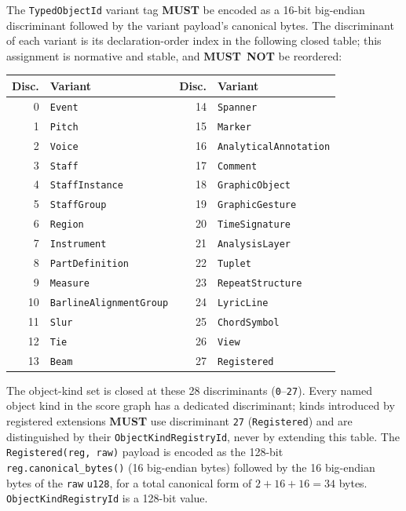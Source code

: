 \documentclass[11pt,letterpaper]{report}
\newcounter{requirement}[chapter]
\newcommand{\MUST}{\textbf{MUST}}
\newcommand{\MUSTNOT}{\textbf{MUST}\nobreak\ \textbf{NOT}}
\begin{document}
\begin{requirement}
  \label{req:graph:typed-object-id-discriminants}
  The \texttt{TypedObjectId} variant tag \MUST{} be encoded as a
  16-bit big-endian discriminant followed by the variant payload's
  canonical bytes. The discriminant of each variant is its
  declaration-order index in the following closed table; this
  assignment is normative and stable, and \MUSTNOT{} be reordered:

  \begin{center}
  \begin{tabular}{r l @{\qquad} r l}
    \toprule
    \textbf{Disc.} & \textbf{Variant} &
    \textbf{Disc.} & \textbf{Variant} \\
    \midrule
    0  & \texttt{Event}                  & 14 & \texttt{Spanner} \\
    1  & \texttt{Pitch}                   & 15 & \texttt{Marker} \\
    2  & \texttt{Voice}                   & 16 & \texttt{AnalyticalAnnotation} \\
    3  & \texttt{Staff}                   & 17 & \texttt{Comment} \\
    4  & \texttt{StaffInstance}           & 18 & \texttt{GraphicObject} \\
    5  & \texttt{StaffGroup}              & 19 & \texttt{GraphicGesture} \\
    6  & \texttt{Region}                  & 20 & \texttt{TimeSignature} \\
    7  & \texttt{Instrument}              & 21 & \texttt{AnalysisLayer} \\
    8  & \texttt{PartDefinition}          & 22 & \texttt{Tuplet} \\
    9  & \texttt{Measure}                 & 23 & \texttt{RepeatStructure} \\
    10 & \texttt{BarlineAlignmentGroup}   & 24 & \texttt{LyricLine} \\
    11 & \texttt{Slur}                    & 25 & \texttt{ChordSymbol} \\
    12 & \texttt{Tie}                     & 26 & \texttt{View} \\
    13 & \texttt{Beam}                    & 27 & \texttt{Registered} \\
    \bottomrule
  \end{tabular}
  \end{center}

  The object-kind set is closed at these 28 discriminants
  (\texttt{0}--\texttt{27}). Every named object kind in the score
  graph has a dedicated discriminant; kinds introduced by registered
  extensions \MUST{} use discriminant \texttt{27}
  (\texttt{Registered}) and are distinguished by their
  \texttt{ObjectKindRegistryId}, never by extending this table. The
  \texttt{Registered(reg, raw)} payload is encoded as the 128-bit
  \texttt{reg.canonical\_bytes()} (16 big-endian bytes) followed by
  the 16 big-endian bytes of the \texttt{raw} \texttt{u128}, for a
  total canonical form of $2 + 16 + 16 = 34$ bytes.
  \texttt{ObjectKindRegistryId} is a 128-bit value.
\end{requirement}
\end{document}
